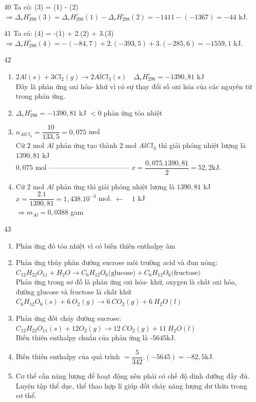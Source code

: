 \def\writeANS{}
\begin{loigiaibth}{40}
  Ta có: (3) = (1) - (2) $\Rightarrow \Delta _r H_{298}^\circ (3) = \Delta _r H_{298}^\circ (1) - \Delta _r H_{298}^\circ (2) = -1411 - (-1367) = -44$ kJ.
\end{loigiaibth}
\def\writeANS{}
\begin{loigiaibth}{41}
  Ta có: (4) = -(1) + 2.(2) + 3.(3) $\Rightarrow \Delta _r H_{298}^\circ (4) = -(-84{,}7) + 2.(-393{,}5) + 3.(-285{,}6) = -1559{,}1$ kJ.
\end{loigiaibth}
\def\writeANS{}
\begin{loigiaibth}{42}
  \begin {enumerate} \item [(a)] $2Al(s) + 3Cl_2(g) \rightarrow 2AlCl_3(s) \quad \Delta _r H_{298}^\circ = -1390{,}81$ kJ \\ Đây là phản ứng oxi hóa- khử vì có sự thay đổi số oxi hóa của các nguyên tử trong phản ứng. \item [(b)] $\Delta _r H_{298}^\circ = -1390{,}81$ kJ $ < 0$ phản ứng tỏa nhiệt \item [(c)] $n_{AlCl_3} = \dfrac {10}{133{,}5} = 0{,}075$ mol \\ Cứ $2$ mol $Al$ phản ứng tạo thành $2$ mol $AlCl_3$ thì giải phóng nhiệt lượng là $1390{,}81$ kJ \\ $0{,}075$ mol ----------------------------------- $x = \dfrac {0{,}075.1390{,}81}{2} = 52{,}2$kJ. \item [(d)] Cứ $2$ mol $Al$ phản ứng thì giải phóng nhiệt lượng là $1390{,}81$ kJ \\ $x = \dfrac {2.1}{1390{,}81} = 1{,}438.10^{-3}$ mol. $\leftarrow \quad 1$ kJ \\ $\Rightarrow m_{Al} = 0{,}0388$ gam \end {enumerate}
\end{loigiaibth}
\def\writeANS{}
\begin{loigiaibth}{43}
  \begin {enumerate} \item [(a)] Phản ứng đó tỏa nhiệt vì có biến thiên enthalpy âm \item [(b)] Phản ứng thủy phân đường sucrose môi trường acid và đun nóng: \\ $C_{12}H_{22}O_{11} + H_2O \rightarrow C_6H_{12}O_6 \text {(glucose)} + C_6H_{12}O_6 \text {(fructose)}$ \\ Phản ứng trong sơ đồ là phản ứng oxi hóa- khử, oxygen là chất oxi hóa, đường glucose và fructose là chất khử $C_6H_{12}O_6(s) + 6 \ O_2(g) \rightarrow 6 \ CO_2(g) + 6 \ H_2O(l)$ \item [(c)] Phản ứng đốt cháy đường sucrose: $C_{12}H_{22}O_{11}(s) + 12O_2(g) \rightarrow 12 \ CO_2(g) + 11 \ H_2O(l)$ \\ Biến thiên enthalpy chuẩn của phản ứng là -$5645$kJ. \item [(d)] Biến thiên enthalpy của quá trình $= \dfrac {5}{342}.(-5645) = -82{,}5$kJ. \item [(e)] Cơ thể cần năng lượng để hoạt động nên phải có chế độ dinh dưỡng đầy đủ. Luyện tập thể dục, thể thao hợp lí giúp đốt cháy năng lượng dư thừa trong cơ thể. \end {enumerate}
\end{loigiaibth}

